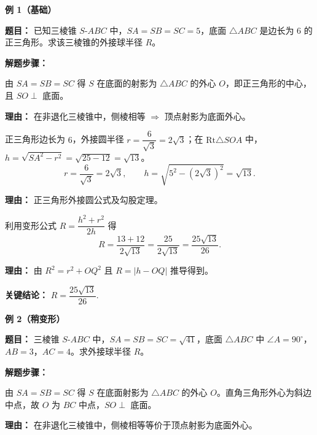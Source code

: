 \begin{examplebox}
\textbf{\textcolor{CExample}{例 1（基础）}}

\textbf{\textcolor{CExample}{题目：}} 已知三棱锥 $S$-$ABC$ 中，$SA=SB=SC=5$，底面 $\triangle ABC$ 是边长为 $6$ 的正三角形。求该三棱锥的外接球半径 $R$。

\textbf{\textcolor{CExample}{解题步骤：}}
\begin{description}[style=nextline, leftmargin=2.8em, labelsep=0.5em, itemsep=0.45em]
    \item[\textbf{第一步（侧棱判断）：}] 由 $SA=SB=SC$ 得 $S$ 在底面的射影为 $\triangle ABC$ 的外心 $O$，即正三角形的中心，且 $SO\perp$ 底面。
    \par\textbf{理由：} 在非退化三棱锥中，侧棱相等 $\Rightarrow$ 顶点射影为底面外心。

    \item[\textbf{第二步（求量计算）：}] 正三角形边长为 $6$，外接圆半径 $r = \dfrac{6}{\sqrt{3}} = 2\sqrt{3}$；在 $\mathrm{Rt}\triangle SOA$ 中，$h = \sqrt{SA^{2}-r^{2}} = \sqrt{25-12}=\sqrt{13}$。
    \[
    r = \frac{6}{\sqrt{3}} = 2\sqrt{3},\qquad h = \sqrt{5^{2}-(2\sqrt{3})^{2}} = \sqrt{13}.
    \]
    \par\textbf{理由：} 正三角形外接圆公式及勾股定理。

    \item[\textbf{第三步（应用结论）：}] 利用变形公式 $R = \dfrac{h^{2}+r^{2}}{2h}$ 得
    \[
    R = \frac{13+12}{2\sqrt{13}} = \frac{25}{2\sqrt{13}} = \frac{25\sqrt{13}}{26}.
    \]
    \par\textbf{理由：} 由 $R^{2}=r^{2}+OQ^{2}$ 且 $R=|h-OQ|$ 推导得到。
\end{description}

\textbf{\textcolor{CExample}{关键结论：}} \textbf{$R = \dfrac{25\sqrt{13}}{26}$}.

\medskip
\textbf{\textcolor{CExample}{例 2（稍变形）}}

\textbf{\textcolor{CExample}{题目：}} 三棱锥 $S$-$ABC$ 中，$SA=SB=SC=\sqrt{41}$，底面 $\triangle ABC$ 中 $\angle A=90^{\circ}$，$AB=3$，$AC=4$。求外接球半径 $R$。

\textbf{\textcolor{CExample}{解题步骤：}}
\begin{description}[style=nextline, leftmargin=2.8em, labelsep=0.5em, itemsep=0.45em]
    \item[\textbf{第一步（侧棱判断）：}] 由 $SA=SB=SC$ 得 $S$ 在底面射影为 $\triangle ABC$ 的外心 $O$。直角三角形外心为斜边中点，故 $O$ 为 $BC$ 中点，$SO\perp$ 底面。
    \par\textbf{理由：} 在非退化三棱锥中，侧棱相等等价于顶点射影为底面外心。


\end{description}
\end{examplebox}
